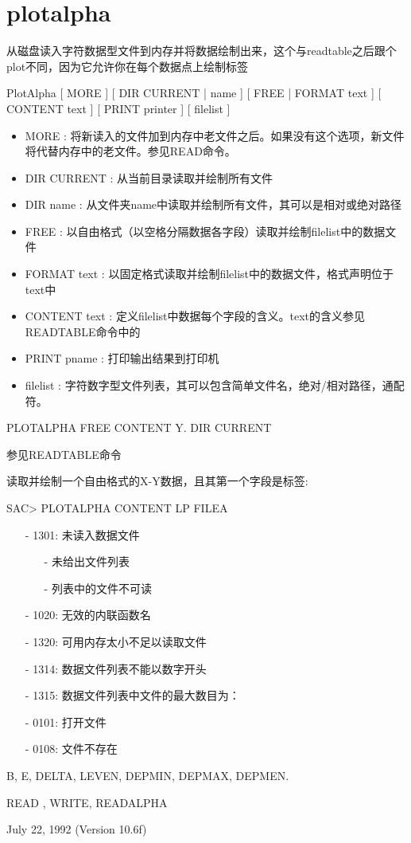 \section{plotalpha}
\label{cmd:plotalpha}

从磁盘读入字符数据型文件到内存并将数据绘制出来，这个与readtable之后跟个plot不同，因为它允许你在每个数据点上绘制标签

PlotAlpha [ MORE ] [ DIR CURRENT | name ] [ FREE | FORMAT text ] [ CONTENT text ] [ PRINT printer ] [ filelist ]

\begin{itemize}
\item MORE : 将新读入的文件加到内存中老文件之后。如果没有这个选项，新文件将代替内存中的老文件。参见READ命令。
\item DIR CURRENT : 从当前目录读取并绘制所有文件 
\item DIR name : 从文件夹name中读取并绘制所有文件，其可以是相对或绝对路径 
\item FREE : 以自由格式（以空格分隔数据各字段）读取并绘制filelist中的数据文件 
\item FORMAT text : 以固定格式读取并绘制filelist中的数据文件，格式声明位于text中 
\item CONTENT text : 定义filelist中数据每个字段的含义。text的含义参见READTABLE命令中的 
\item PRINT pname : 打印输出结果到打印机 
\item filelist : 字符数字型文件列表，其可以包含简单文件名，绝对/相对路径，通配符。 
\end{itemize}

PLOTALPHA FREE CONTENT Y. DIR CURRENT

参见READTABLE命令

读取并绘制一个自由格式的X-Y数据，且其第一个字段是标签:
\begin{SACCode}
SAC> PLOTALPHA CONTENT LP FILEA
\end{SACCode}

\begin{itemize}
\item[-]1301: 未读入数据文件
	\begin{itemize}
	\item[-]未给出文件列表
	\item[-]列表中的文件不可读
	\end{itemize}
\item[-]1020: 无效的内联函数名
\item[-]1320: 可用内存太小不足以读取文件
\item[-]1314: 数据文件列表不能以数字开头
\item[-]1315: 数据文件列表中文件的最大数目为：
\end{itemize}

\begin{itemize}
\item[-]0101: 打开文件
\item[-]0108: 文件不存在
\end{itemize}

B, E, DELTA, LEVEN, DEPMIN, DEPMAX, DEPMEN.

READ , WRITE, READALPHA

July 22, 1992 (Version 10.6f)
